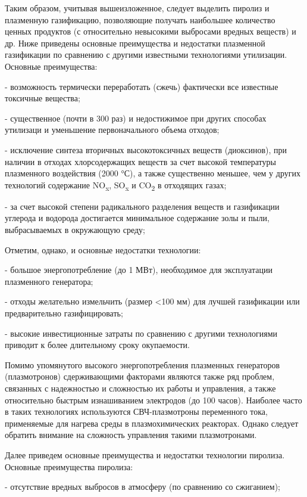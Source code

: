 \begin{multicols}{2}
Таким образом, учитывая вышеизложенное, следует выделить пиролиз и
плазменную газификацию, позволяющие получать наибольшее количество
ценных продуктов (с относительно невысокими выбросами вредных веществ) и
др. Ниже приведены основные преимущества и недостатки плазменной
газификации по сравнению с другими известными технологиями утилизации.
Основные преимущества:

- возможность термически переработать (сжечь) фактически все известные
токсичные вещества;

- существенное (почти в 300 раз) и недостижимое при других способах
утилизаци и уменьшение первоначального объема отходов;

- исключение синтеза вторичных высокотоксичных веществ (диоксинов), при
наличии в отходах хлорсодержащих веществ за счет высокой температуры
плазменного воздействия (2000 °С), а также существенно меньшее, чем у
других технологий содержание NO\textsubscript{x}, SO\textsubscript{x} и
CO\textsubscript{2} в отходящих газах;

- за счет высокой степени радикального разделения веществ и газификации
углерода и водорода достигается минимальное содержание золы и пыли,
выбрасываемых в окружающую среду;

Отметим, однако, и основные недостатки технологии:

- большое энергопотребление (до 1 МВт), необходимое для эксплуатации
плазменного генератора;

- отходы желательно измельчить (размер <100 мм) для лучшей
газификации или предварительно газифицировать;

- высокие инвестиционные затраты по сравнению с другими технологиями
приводит к более длительному сроку окупаемости.

Помимо упомянутого высокого энергопотребления плазменных генераторов
(плазмотронов) сдерживающими факторами являются также ряд проблем,
связанных с надежностью и сложностью их работы и управления, а также
относительно быстрым изнашиванием электродов (до 100 часов). Наиболее
часто в таких технологиях используются СВЧ-плазмотроны переменного тока,
применяемые для нагрева среды в плазмохимических реакторах. Однако
следует обратить внимание на сложность управления такими плазмотронами.

Далее приведем основные преимущества и недостатки технологии пиролиза.
Основные преимущества пиролиза:

- отсутствие вредных выбросов в атмосферу (по срав­нению со сжиганием);


\end{multicols}
